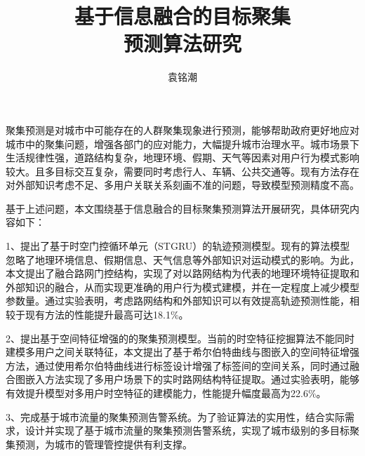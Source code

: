 \documentclass[master]{thesis-uestc}
\title{基于信息融合的目标聚集\\预测算法研究}{Research on Target Gather Prediction Algorithm based on Information Fusion}
\author{袁铭潮}{Mingchao Yuan}
\begin{document}
\makecover
\originalitydeclaration
\begin{chineseabstract}
聚集预测是对城市中可能存在的人群聚集现象进行预测，能够帮助政府更好地应对城市中的聚集问题，增强各部门的应对能力，大幅提升城市治理水平。城市场景下生活规律性强，道路结构复杂，地理环境、假期、天气等因素对用户行为模式影响较大。且多目标交互复杂，需要同时考虑行人、车辆、公共交通等。现有方法存在对外部知识考虑不足、多用户关联关系刻画不准的问题，导致模型预测精度不高。

基于上述问题，本文围绕基于信息融合的目标聚集预测算法开展研究，具体研究内容如下：

1、提出了基于时空门控循环单元（STGRU）的轨迹预测模型。现有的算法模型忽略了地理环境信息、假期信息、天气信息等外部知识对运动模式的影响。为此，本文提出了融合路网门控结构，实现了对以路网结构为代表的地理环境特征提取和外部知识的融合，从而实现更准确的用户行为模式建模，并在一定程度上减少模型参数量。通过实验表明，考虑路网结构和外部知识可以有效提高轨迹预测性能，相较于现有方法的性能提升最高可达18.1$\%$。

2、提出基于空间特征增强的的聚集预测模型。当前的时空特征挖掘算法不能同时建模多用户之间关联特征，本文提出了基于希尔伯特曲线与图嵌入的空间特征增强方法，通过使用希尔伯特曲线进行标签设计增强了标签间的空间关系，同时通过融合图嵌入方法实现了多用户场景下的实时路网结构特征提取。通过实验表明，能够有效提升模型对多用户时空特征的建模能力，性能提升幅度最高为22.6$\%$。

3、完成基于城市流量的聚集预测告警系统。为了验证算法的实用性，结合实际需求，设计并实现了基于城市流量的聚集预测告警系统，实现了城市级别的多目标聚集预测，为城市的管理管控提供有利支撑。

\end{chineseabstract}
\end{document}
